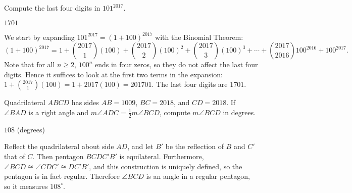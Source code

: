 \documentclass[11pt]{article}
\begin{document}
\begin{problem}%
Compute the last four digits in $101^{2017}$.
\end{problem}

\begin{answer}
$\boxed{1701}$
\end{answer}

\begin{solution}
We start by expanding $101^{2017} = (1 + 100)^{2017}$ with the Binomial Theorem:
\[(1 + 100)^{2017} = 1 + \binom{2017}{1}(100) + \binom{2017}{2}(100)^2 + 
\binom{2017}{3}(100)^3 + \cdots + \binom{2017}{2016}100^{2016} + 100^{2017}.\]
Note that for all $n \ge 2$, $100^n$ ends in four zeros, so they do not affect
the last four digits. Hence it suffices to look at the first two terms in the 
expansion: $1 + \binom{2017}{1}(100) = 1 + 2017(100) = 201701$. The last
four digits are $\boxed{1701}$.
\end{solution}


\begin{problem}
Quadrilateral $ABCD$ has sides $AB = 1009$, $BC = 2018$, and $CD = 2018$. If $\angle BAD$ is a right angle 
and $m\angle ADC = \frac{1}{2}m\angle BCD$, compute $m\angle BCD$ in degrees.
\end{problem}

\begin{answer}
$\boxed{108}$ (degrees)
\end{answer}

\begin{solution}
Reflect the quadrilateral about side $AD$, and let $B'$ be the reflection of $B$ and $C'$ that of $C$. 
Then pentagon $BCDC'B'$ is equilateral. Furthermore, $\angle BCD \cong \angle CDC' \cong DC'B'$, 
and this construction is uniquely defined, so the pentagon is in fact regular. 
Therefore $\angle BCD$ is an angle in a regular pentagon, so it measures $\boxed{108^\circ}$.
\end{solution}
\end{document}
